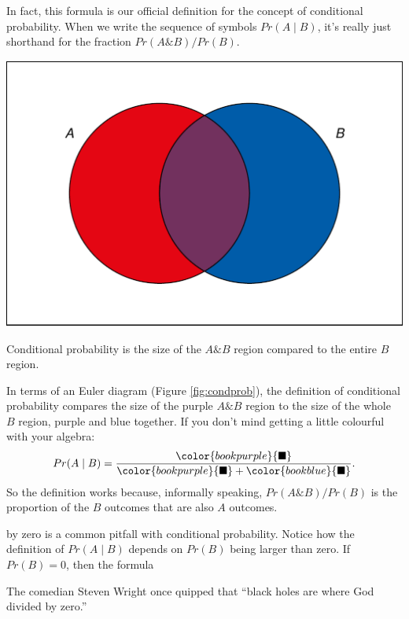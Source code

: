 \documentclass[justified]{tufte-book}
\newcommand{\given}{\mid}
\renewcommand{\wedge}{\mathbin{\&}}
\newcommand{\p}{Pr}
\theoremstyle{definition}
\theoremstyle{definition}
\theoremstyle{definition}
\theoremstyle{definition}
\theoremstyle{remark}
\begin{document}
In fact, this formula is our official definition for the concept of conditional probability. When we write the sequence of symbols \(\p(A \given B)\), it's really just shorthand for the fraction \(\p(A \wedge B) / \p(B)\).

\begin{marginfigure}
\includegraphics{_main_files/figure-latex/condprob-1} \caption[Conditional probability is the size of the $A \wedge B$ region compared to the entire $B$ region]{Conditional probability is the size of the $A \wedge B$ region compared to the entire $B$ region.}\label{fig:condprob}
\end{marginfigure}

In terms of an Euler diagram (Figure \ref{fig:condprob}), the definition of conditional probability compares the size of the purple \(A \wedge B\) region to the size of the whole \(B\) region, purple and blue together. If you don't mind getting a little colourful with your algebra:
\[
  \p(A \given B) = \frac{\color{bookpurple}{\blacksquare}}{\color{bookpurple}{\blacksquare} + \color{bookblue}{\blacksquare}}.
\]
So the definition works because, informally speaking, \(\p(A \wedge B)/\p(B)\) is the proportion of the \(B\) outcomes that are also \(A\) outcomes.

 by zero is a common pitfall with conditional probability. Notice how the definition of \(\p(A \given B)\) depends on \(\p(B)\) being larger than zero. If \(\p(B) = 0\), then the formula

\begin{marginfigure}
The comedian Steven Wright once quipped that ``black holes are where God
divided by zero.''
\end{marginfigure}
\end{document}
